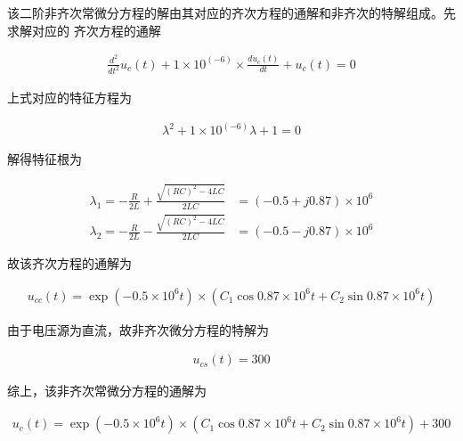 \documentclass[a4paper]{article}
\begin{document}
该二阶非齐次常微分方程的解由其对应的齐次方程的通解和非齐次的特解组成。先求解对应的
齐次方程的通解

\begin{equation}
    \begin{aligned}
        \frac{d^2}{dt^2}u_c(t)+1\times 10^{(-6)}\times\frac{du_c(t)}{dt}+u_c(t) = 0
    \end{aligned}
\end{equation}

上式对应的特征方程为

\begin{equation}
    \begin{aligned}
        \lambda^2+1\times 10^{(-6)}\lambda+1=0
    \end{aligned}
\end{equation}

解得特征根为

\begin{equation}
    \begin{aligned}
        \lambda_1 = -\frac{R}{2L}+\frac{\sqrt{(RC)^2-4LC}}{2LC} &= (-0.5+j0.87)\times 10^{6}\\
        \lambda_2 = -\frac{R}{2L}-\frac{\sqrt{(RC)^2-4LC}}{2LC} &= (-0.5-j0.87)\times 10^{6}
    \end{aligned}
\end{equation}

故该齐次方程的通解为

\begin{equation}
    \begin{aligned}
        u_{cc}(t) = \exp(-0.5\times 10^{6}t)\times (C_1\cos0.87\times 10^6 t+C_2\sin0.87\times 10^6 t)
    \end{aligned}
\end{equation}

由于电压源为直流，故非齐次微分方程的特解为

\begin{equation}
    \begin{aligned}
        u_{cs}(t) = 300
    \end{aligned}
\end{equation}

综上，该非齐次常微分方程的通解为

\begin{equation}
    \begin{aligned}
        u_{c}(t) = \exp(-0.5\times 10^{6}t)\times (C_1\cos0.87\times 10^6 t+C_2\sin0.87\times 10^6 t) + 300
    \end{aligned}
\end{equation}
\end{document}
